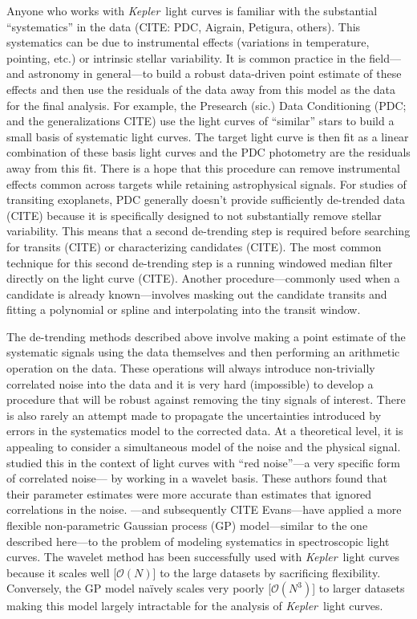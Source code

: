 \documentclass[12pt,preprint]{aastex}
\newcommand{\project}[1]{{\emph{#1}}}
\newcommand{\kepler}{\project{Kepler}}
\begin{document}
Anyone who works with \kepler\ light curves is familiar with the substantial
``systematics'' in the data (CITE: PDC, Aigrain, Petigura, others).
This systematics can be due to instrumental effects (variations in
temperature, pointing, etc.) or intrinsic stellar variability.
It is common practice in the field---and astronomy in general---to build a
robust data-driven point estimate of these effects and then use the residuals
of the data away from this model as the data for the final analysis.
For example, the Presearch (sic.) Data Conditioning (PDC; and the
generalizations CITE) use the light curves of ``similar'' stars to build a
small basis of systematic light curves.
The target light curve is then fit as a linear combination of these basis
light curves and the PDC photometry are the residuals away from this fit.
There is a hope that this procedure can remove instrumental effects common
across targets while retaining astrophysical signals.
For studies of transiting exoplanets, PDC generally doesn't provide
sufficiently de-trended data (CITE) because it is specifically designed to not
substantially remove stellar variability.
This means that a second de-trending step is required before searching for
transits (CITE) or characterizing candidates (CITE).
The most common technique for this second de-trending step is a running
windowed median filter directly on the light curve (CITE).
Another procedure---commonly used when a candidate is already known---involves
masking out the candidate transits and fitting a polynomial or spline and
interpolating into the transit window.

The de-trending methods described above involve making a point estimate of the
systematic signals using the data themselves and then performing an arithmetic
operation on the data.
These operations will always introduce non-trivially correlated noise into the
data and it is very hard (impossible) to develop a procedure that will be
robust against removing the tiny signals of interest.
There is also rarely an attempt made to propagate the uncertainties introduced
by errors in the systematics model to the corrected data.
At a theoretical level, it is appealing to consider a simultaneous model of
the noise and the physical signal.
\citet{carter} studied this in the context of light curves with ``red
noise''---a very specific form of correlated noise--- by working in a wavelet
basis.
These authors found that their parameter estimates were more accurate than
estimates that ignored correlations in the noise.
\citet{gibson-gp}---and subsequently CITE Evans---have applied a more
flexible non-parametric Gaussian process (GP) model---similar to the one
described here---to the problem of modeling systematics in spectroscopic
light curves.
The wavelet method has been successfully used with \kepler\ light
curves because it scales well [$\mathcal{O}(N)$] to the large datasets by
sacrificing flexibility.
Conversely, the GP model na\"ively scales very poorly [$\mathcal{O}(N^3)$] to
larger datasets making this model largely intractable for the analysis of
 \kepler\ light curves.
\end{document}
